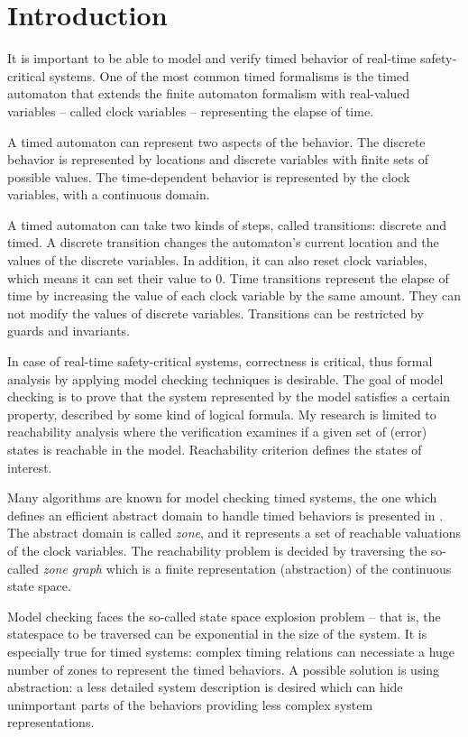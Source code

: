 \chapter{Introduction}
\label{chap:introduction}
It is important to be able to model and verify timed behavior of
real-time safety-critical systems. One of the most common timed formalisms is 
the timed automaton that extends the finite automaton formalism
with real-valued variables -- called clock variables -- representing the elapse
of time.

A timed automaton can represent two aspects of the behavior. The discrete behavior
is represented by locations and discrete variables with finite sets of possible
values. The time-dependent behavior is represented by the clock variables, with
a continuous domain.

A timed automaton can take two kinds of steps, called transitions: discrete and timed.
A discrete transition changes the automaton's current location and the values of the discrete variables. In addition, it can also reset clock variables, which means it can set their value to 0.
Time transitions represent the elapse of time by increasing the value of each clock variable by the same amount. They can not modify the values of discrete variables. Transitions can be restricted by guards and invariants.

In case of real-time safety-critical systems, correctness is critical, thus
formal  analysis by applying model checking techniques is desirable.
The goal of model checking is to prove that the system represented by the
model satisfies a certain property, described by some kind of
logical formula. 
My research is limited to reachability analysis where the verification examines if a given set of (error) states is reachable in the model. Reachability criterion defines the states of interest.

Many algorithms are known for model checking timed systems, the one which
defines an efficient abstract domain to handle timed behaviors is presented in
\cite{bengtsson2004timed}. The abstract domain is called \emph{zone}, and it represents a set of reachable valuations of the clock
variables. The reachability problem is decided by traversing the so-called \emph{zone graph}
which is a finite representation (abstraction) of the continuous
state space.

Model checking faces the so-called state space explosion problem --
that is, the statespace to be traversed can be exponential in the size of the system.
It is especially true for timed systems: complex timing relations can necessiate a huge number of zones to represent the timed behaviors.
A possible solution is using abstraction: a less detailed system description is desired which can
hide unimportant parts of the behaviors providing less complex system
representations.

